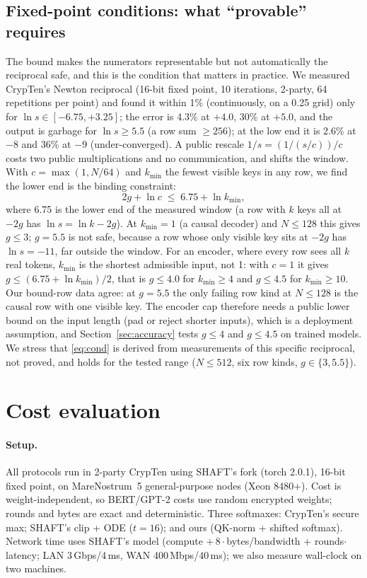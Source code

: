 \documentclass[11pt]{article}
\begin{document}
\subsection{Fixed-point conditions: what ``provable'' requires}\label{sec:conditions}
The bound makes the numerators representable but not automatically the reciprocal safe, and this is the
condition that matters in practice. We measured CrypTen's Newton reciprocal (16-bit fixed point,
10 iterations, 2-party, 64 repetitions per point) and found it within 1\% (continuously, on a 0.25 grid) only for
$\ln s\in[-6.75,+3.25]$; the error is 4.3\% at $+4.0$, 30\% at $+5.0$, and the output is garbage for
$\ln s\ge 5.5$ (a row sum $\ge 256$); at the low end it is 2.6\% at $-8$ and 36\% at $-9$
(under-converged). A public rescale $1/s=(1/(s/c))/c$ costs two public multiplications and no
communication, and shifts the window. With $c=\max(1,N/64)$ and $k_{\min}$ the fewest visible keys in
any row, we find the lower end is the binding constraint:
\begin{equation}
2g+\ln c\;\le\;6.75+\ln k_{\min},\label{eq:cond}
\end{equation}
where 6.75 is the lower end of the measured window (a row with $k$ keys all at $-2g$ has $\ln s=\ln k-2g$).
At $k_{\min}=1$ (a causal decoder) and $N\le128$ this gives $g\le 3$; $g=5.5$ is not safe, because a row
whose only visible key sits at $-2g$ has $\ln s=-11$, far outside the window. For an encoder, where every row sees all $k$ real tokens, $k_{\min}$ is the shortest admissible input, not 1: with $c=1$ it gives $g\le(6.75+\ln k_{\min})/2$, that is $g\le4.0$ for $k_{\min}\ge4$ and $g\le4.5$ for $k_{\min}\ge10$. Our bound-row data agree: at $g=5.5$ the only failing row kind at $N\le128$ is the causal row with one visible key. The encoder cap therefore needs a public lower bound on the input length (pad or reject shorter inputs), which is a deployment assumption, and Section~\ref{sec:accuracy} tests $g\le4$ and $g\le4.5$ on trained models. We stress that
\eqref{eq:cond} is derived from measurements of this specific reciprocal, not proved, and holds for
the tested range ($N\le512$, six row kinds, $g\in\{3,5.5\}$).

\section{Cost evaluation}\label{sec:cost}
\paragraph{Setup.}
All protocols run in 2-party CrypTen using SHAFT's fork (torch 2.0.1), 16-bit fixed point, on
MareNostrum~5 general-purpose nodes (Xeon 8480+). Cost is weight-independent, so BERT/GPT-2
costs use random encrypted weights; rounds and bytes are exact and deterministic. Three softmaxes:
CrypTen's secure max; SHAFT's clip + ODE ($t=16$); and ours (QK-norm + shifted softmax).
Network time uses SHAFT's model (compute $+\,8\cdot$bytes/bandwidth $+$ rounds$\cdot$latency; LAN
3\,Gbps/4\,ms, WAN 400\,Mbps/40\,ms); we also measure wall-clock on two machines.
\end{document}
